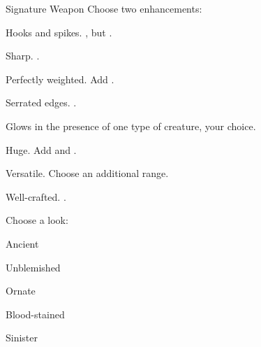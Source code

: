 \documentclass[8pt]{extarticle}
\begin{document}
\begin{minipage}[t]{4.6in}
\begin{basicmove}{Signature Weapon}
  Choose two enhancements:

  \begin{choices}
  \item Hooks and spikes. , but .
  \item Sharp. .
  \item Perfectly weighted. Add .
  \item Serrated edges. .
  \item Glows in the presence of one type of creature, your choice.
  \item Huge. Add  and .
  \item Versatile. Choose an additional range.
  \item Well-crafted. .
  \end{choices}


  Choose a look:

  \begin{choices}
  \item Ancient
  \item Unblemished
  \item Ornate
  \item Blood-stained
  \item Sinister
  \end{choices}

\end{basicmove}

\vfill\null
\end{minipage}

\charlower
\clearpage

\gearbanner
\end{document}
